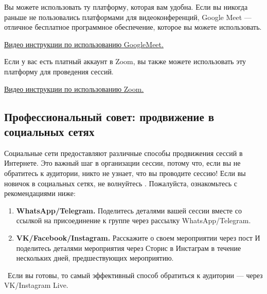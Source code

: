 Вы можете использовать ту платформу, которая вам удобна. Если вы никогда раньше не пользовались платформами для видеоконференций, Google Meet — отличное бесплатное программное обеспечение, которое вы можете использовать. 

\href{https://drive.google.com/file/d/1aqEODSOCmS3BdFkcbs-sf_Aa1cjpd37d/view?usp=sharing}{Видео инструкции по использованию GoogleMeet.}

Если у вас есть платный аккаунт в Zoom, вы также можете использовать эту платформу для проведения сессий.

\href{https://drive.google.com/file/d/10llvQ_0aU7aWvye_Qvgj59LNMaya3aF8/view?usp=sharing}{Видео инструкции по использованию Zoom.}

\subsection*{Профессиональный совет: продвижение в социальных сетях}
\label{sec:profAdv2}

Социальные сети предоставляют различные способы продвижения сессий в Интернете. Это важный шаг в организации сессии, потому что, если вы не обратитесь к аудитории, никто не узнает, что вы проводите сессию!
Если вы новичок в социальных сетях, не волнуйтесь \faSmileO. Пожалуйста, ознакомьтесь с рекомендациями ниже:
\begin{enumerate}
    \item \textbf{WhatsApp/Telegram.} Поделитесь деталями вашей сессии вместе со ссылкой на присоединение к группе через рассылку WhatsApp/Telegram.
    \item \textbf{VK/Facebook/Instagram.} Расскажите о своем мероприятии через пост И поделитесь деталями мероприятия через Сторис в Инстаграм в течение нескольких дней, предшествующих мероприятию.
\end{enumerate}


\faLightbulbO\ Если вы готовы, то самый эффективный способ обратиться к аудитории — через VK/Instagram Live.

% 
% 

